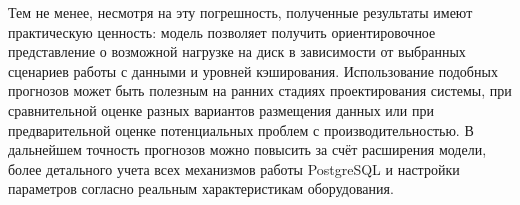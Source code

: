 Тем не менее, несмотря на эту погрешность, полученные результаты имеют практическую ценность: модель позволяет 
получить ориентировочное представление о возможной нагрузке на диск в зависимости от выбранных сценариев работы с 
данными и уровней кэширования. Использование подобных прогнозов может быть полезным на ранних стадиях проектирования 
системы, при сравнительной оценке разных вариантов размещения данных или при предварительной оценке потенциальных 
проблем с производительностью. В дальнейшем точность прогнозов можно повысить за счёт расширения модели, 
более детального учета всех механизмов работы PostgreSQL и настройки параметров согласно реальным характеристикам оборудования.
